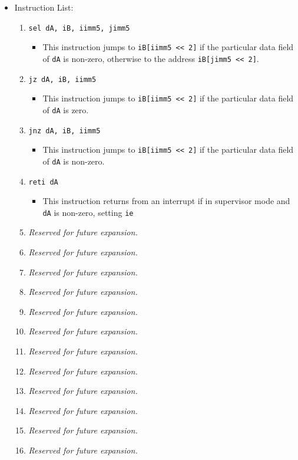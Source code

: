 \documentclass{article}
\begin{document}
\begin{itemize}
		\item Instruction List:
			\begin{enumerate}
			\item \texttt{sel dA, iB, iimm5, jimm5}
				\begin{itemize}
				\item This instruction jumps to \texttt{iB[iimm5 << 2]} if
				the particular data field of \texttt{dA}
				is non-zero, otherwise to the address \texttt{iB[jimm5 <<
				2]}.
				\end{itemize}
			\item \texttt{jz dA, iB, iimm5}
				\begin{itemize}
				\item This instruction jumps to \texttt{iB[iimm5 << 2]}
				if the particular data field of \texttt{dA} is zero.
				\end{itemize}
			\item \texttt{jnz dA, iB, iimm5}
				\begin{itemize}
				\item This instruction jumps to \texttt{iB[iimm5 << 2]}
				if the particular data field of \texttt{dA} is non-zero.
				\end{itemize}
			\item \texttt{reti dA}
				\begin{itemize}
				\item This instruction returns from an interrupt if in
				supervisor mode and \texttt{dA} is non-zero, setting
				\texttt{ie}
				\end{itemize}

			\item \textit{Reserved for future expansion.}
			\item \textit{Reserved for future expansion.}
			\item \textit{Reserved for future expansion.}
			\item \textit{Reserved for future expansion.}

			\item \textit{Reserved for future expansion.}
			\item \textit{Reserved for future expansion.}
			\item \textit{Reserved for future expansion.}
			\item \textit{Reserved for future expansion.}

			\item \textit{Reserved for future expansion.}
			\item \textit{Reserved for future expansion.}
			\item \textit{Reserved for future expansion.}
			\item \textit{Reserved for future expansion.}
			\end{enumerate}
		\end{itemize}
		\newpage



\end{document}
